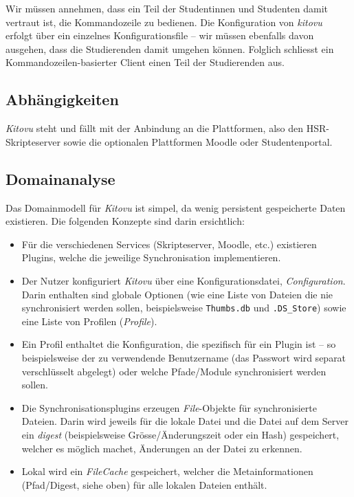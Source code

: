 \documentclass[a4paper]{article}
\let\oldsection\section
\renewcommand\section{\clearpage\oldsection}
\begin{document}
Wir müssen annehmen, dass ein Teil der Studentinnen und Studenten damit vertraut ist, die Kommandozeile zu bedienen. Die Konfiguration von \emph{kitovu} erfolgt über ein einzelnes Konfigurationsfile -- wir müssen ebenfalls davon ausgehen, dass die Studierenden damit umgehen können. Folglich schliesst ein Kommandozeilen-basierter Client einen Teil der Studierenden aus.

\subsection{Abhängigkeiten}
\emph{Kitovu} steht und fällt mit der Anbindung an die Plattformen, also den HSR-Skripteserver sowie die optionalen Plattformen Moodle oder Studentenportal.


\pagebreak
\begin{landscape}
  \thispagestyle{empty}
  \section{Domainanalyse}
  Das Domainmodell für \emph{Kitovu} ist simpel, da wenig persistent
  gespeicherte Daten existieren. Die folgenden Konzepte sind darin ersichtlich:

  \begin{itemize}
  \item Für die verschiedenen Services (Skripteserver, Moodle, etc.) existieren
    Plugins, welche die jeweilige Synchronisation implementieren.
  \item Der Nutzer konfiguriert \emph{Kitovu} über eine Konfigurationsdatei,
    \emph{Configuration}. Darin enthalten sind globale Optionen (wie eine Liste
    von Dateien die nie synchronisiert werden sollen, beispielsweise
    \verb|Thumbs.db| und \verb|.DS_Store|) sowie eine Liste von Profilen
(\emph{Profile}).
  \item Ein Profil enthaltet die Konfiguration, die spezifisch für ein Plugin
    ist -- so beispielsweise der zu verwendende Benutzername (das Passwort wird
    separat verschlüsselt abgelegt) oder welche Pfade/Module synchronisiert
    werden sollen.
  \item Die Synchronisationsplugins erzeugen \emph{File}-Objekte für
    synchronisierte Dateien. Darin wird jeweils für die lokale Datei
    und die Datei auf dem Server ein \emph{digest} (beispielsweise
    Grösse/Änderungszeit oder ein Hash) gespeichert, welcher es möglich machet,
    Änderungen an der Datei zu erkennen.
  \item Lokal wird ein \emph{FileCache} gespeichert, welcher die
    Metainformationen (Pfad/Digest, siehe oben) für alle lokalen Dateien
    enthält.
  \end{itemize}


\end{landscape}
\end{document}
